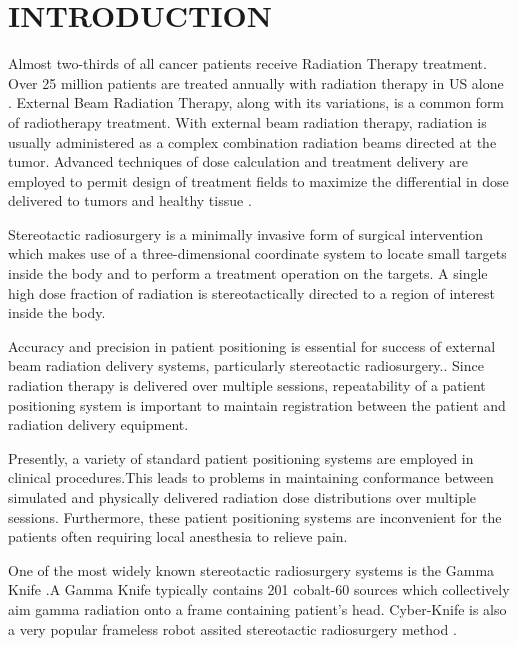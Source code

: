 
\section{INTRODUCTION}
\label{sec:introduction}

Almost two-thirds of all cancer patients receive Radiation Therapy treatment. Over 25 million patients are treated annually with radiation therapy 
in US alone \cite{american2010physician}. External Beam Radiation Therapy, along with its variations, is a common form of radiotherapy treatment. 
With external beam radiation therapy, radiation is usually administered as a complex combination radiation beams directed at the tumor. 
Advanced techniques of dose calculation and treatment delivery are employed to 
permit design of treatment fields to maximize the differential in dose 
delivered to tumors and healthy tissue \cite{hendee2013radiation, schweikard1993motion, chui2001inverse}.

Stereotactic radiosurgery is a minimally invasive form of surgical intervention 
which makes use of a three-dimensional coordinate system to locate small 
targets inside the body and to perform a treatment operation on the targets.
A single high dose fraction of radiation is stereotactically directed to a region of interest inside the body.
 
Accuracy and precision in patient positioning is essential for success of 
external beam radiation delivery systems, particularly stereotactic radiosurgery.. Since radiation therapy is delivered over 
multiple sessions, repeatability of a patient positioning system is important 
to maintain registration between the patient and radiation delivery equipment.

Presently, a variety of standard patient positioning  systems are employed in 
clinical procedures.This leads to problems in maintaining conformance between
simulated and physically delivered radiation dose distributions over multiple 
sessions. Furthermore, these patient positioning systems are inconvenient 
for the patients often requiring local anesthesia to relieve pain.

One of the most widely known stereotactic radiosurgery systems is the Gamma Knife \cite{de1989stereotactic}.A Gamma Knife typically contains 201 cobalt-60 sources which collectively aim gamma radiation onto a frame containing patient's head. Cyber-Knife is also a very popular frameless robot assited stereotactic radiosurgery method \cite{coste2005robotic}.

